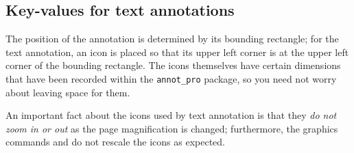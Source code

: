 \documentclass[12pt]{article}
\begin{document}
\subsection{Key-values for text annotations}

The position of the annotation is determined by its bounding rectangle; for the
text annotation, an icon is placed so that its upper left corner is at the upper
left corner of the bounding rectangle. The icons themselves have certain dimensions
that have been recorded within the \texttt{annot\_pro} package, so you need not worry
about leaving space for them.

An important fact about the icons used by text annotation is that they \emph{do not zoom in or out} as the page
magnification is changed; furthermore, the graphics commands  and  do not rescale
the icons as expected.
\end{document}
